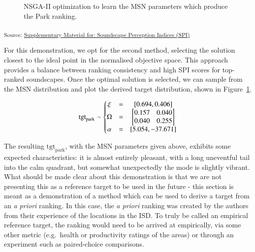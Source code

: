\documentclass[
  authoryear,
  3p]{elsarticle}
\begin{document}
\begin{figure}
\begin{minipage}{0.50\linewidth}
{}


\end{minipage}%

\caption{\label{fig-pymoo-parks}NSGA-II optimization to learn the MSN
parameters which produce the Park ranking.}

\end{figure}%

\textsubscript{Source:
\href{https://manuscripts.drandrewmitchell.com/notebooks/TargetOptimization-preview.html\#cell-fig-pymoo-parks}{Supplementary
Material for: Soundscape Perception Indices (SPI) }}

For this demonstration, we opt for the second method, selecting the
solution closest to the ideal point in the normalised objective space.
This approach provides a balance between ranking consistency and high
SPI scores for top-ranked soundscapes. Once the optimal solution is
selected, we can sample from the MSN distribution and plot the derived
target distribution, shown in Figure~\ref{fig-pymoo-parks}.

\[
\textup{tgt}_{\textup{park}} \sim  \left\{\begin{matrix}
    \xi&=&[0.694, 0.406] \\
    \Omega&=&\begin{bmatrix}
        0.157 & 0.040 \\ 
        0.040 & 0.255 
    \end{bmatrix} \\
    \alpha&=&[5.054, -37.671]
\end{matrix}\right.
\]

The resulting \(\text{tgt}_{\text{park}}\), with the MSN parameters
given above, exhibits some expected characteristics: it is almost
entirely pleasant, with a long uneventful tail into the calm quadrant,
but somewhat unexpectedly the mode is slightly vibrant. What should be
made clear about this demonstration is that we are not presenting this
as a reference target to be used in the future - this section is meant
as a demonstration of a method which can be used to derive a target from
an \emph{a priori} ranking. In this case, the \emph{a priori} ranking
was created by the authors from their experience of the locations in the
ISD. To truly be called an empirical reference target, the ranking would
need to be arrived at empirically, via some other metric (e.g.~health or
productivity ratings of the areas) or through an experiment such as
paired-choice comparisons.
\end{document}
